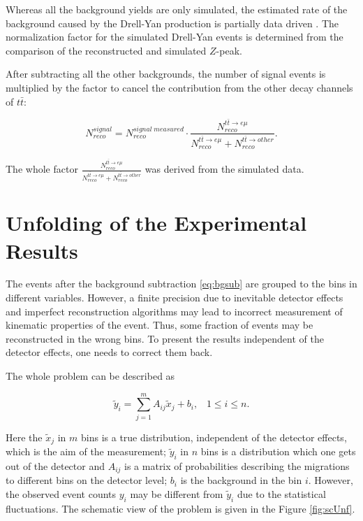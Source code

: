 Whereas all the background yields are only simulated, the estimated rate of the background caused by the Drell-Yan production is 
partially data driven \cite{Chatrchyan:2011nb}. The normalization factor for the simulated Drell-Yan events is determined 
from the comparison of the reconstructed and simulated $Z$-peak. 

After subtracting all the other backgrounds, the number of signal events is multiplied by the factor to cancel the contribution
from the other decay channels of $t\bar{t}$:

\begin{equation}\label{eq:bgsub}
 N^{signal}_{reco} = N^{signal\;measured}_{reco} \cdot \frac{N^{t\bar{t} \rightarrow e\mu}_{reco}}{N^{t\bar{t} \rightarrow e\mu}_{reco} + N^{t\bar{t} \rightarrow other}_{reco}}.
\end{equation}

The whole factor $\frac{N^{t\bar{t} \rightarrow e\mu}_{reco}}{N^{t\bar{t} \rightarrow e\mu}_{reco} + N^{t\bar{t} \rightarrow other}_{reco}}$ was derived
from the simulated data.

\section{Unfolding of the Experimental Results}\label{sec:unfold}

The events after the background  subtraction \ref{eq:bgsub} are grouped to the bins in different variables. However, a finite precision
due to inevitable detector effects and imperfect reconstruction algorithms may lead to incorrect measurement of kinematic properties of the event.
Thus, some fraction of events may be reconstructed in the wrong bins. To present the results independent of the detector effects,
one needs to correct them back.

The whole problem can be described as

\begin{equation}\label{eq:UnfoldProb}
 \tilde{y}_i = \sum_{j = 1}^{m} A_{ij}\tilde{x}_{j} + b_{i}, \;\;\; 1 \leq i \leq n.
\end{equation}

Here the $\tilde{x}_j$ in $m$ bins is a true distribution, independent of the detector effects, which is the aim of the measurement;
$\tilde{y}_i$ in $n$ bins is a distribution which one gets out of the detector and $A_{ij}$ is a matrix of probabilities describing 
the migrations to different bins on the detector level; $b_{i}$ is the background in the bin $i$. 
However, the observed event counts $y_{i}$ may be different from $\tilde{y}_{i}$ due to the statistical fluctuations.
The schematic view of the problem is given in the Figure \ref{fig:scUnf}.

